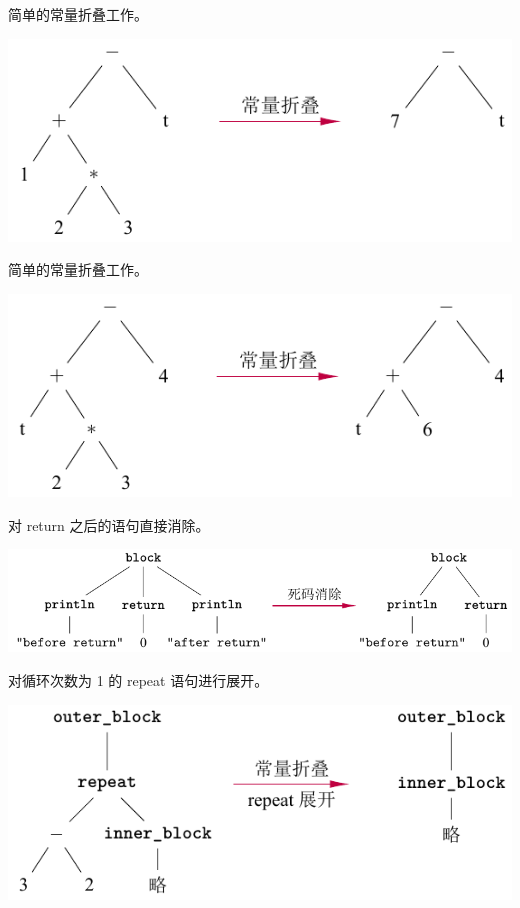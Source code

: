 \documentclass[dvipsnames, svgnames, x11names]{beamer}
\begin{document}
\begin{frame}
    简单的常量折叠工作。

    \vspace{\baselineskip}
    \includegraphics{../figure/optimizer1.pdf}
\end{frame}

\begin{frame}
    简单的常量折叠工作。

    \vspace{\baselineskip}
    \includegraphics{../figure/optimizer2.pdf}
\end{frame}

\begin{frame}
    对 return 之后的语句直接消除。

    \vspace{\baselineskip}
    \includegraphics[width=\linewidth]{../figure/optimizer3.pdf}
\end{frame}

\begin{frame}
    对循环次数为 1 的 repeat 语句进行展开。

    \vspace{\baselineskip}
    \includegraphics[width=\linewidth]{../figure/optimizer4.pdf}
\end{frame}
\end{document}
